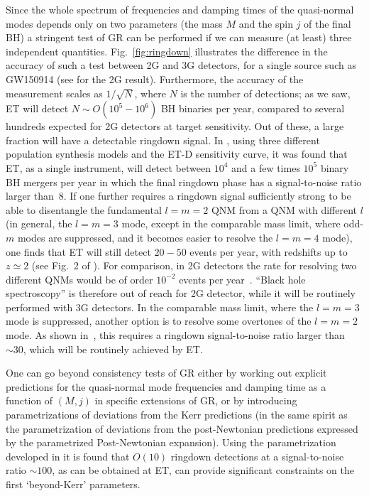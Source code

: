 Since the whole spectrum of frequencies and damping times of the quasi-normal modes depends only on two parameters (the mass $M$ and the spin $j$ of the final BH)  a stringent test of GR can be performed if we can  
measure (at least) three independent quantities. Fig.~\ref{fig:ringdown} illustrates the difference in the accuracy of such a test between 2G and 3G detectors, for a single source such as GW150914 (see \cite{Brito:2018rfr} for the 2G result). Furthermore, 
the accuracy of the measurement scales as $1/\sqrt{N}$, where $N$ is the number of detections;
as we saw, ET will detect $N\sim O(10^5-10^6)$ BH binaries per year,   compared to several hundreds expected for 2G detectors at target sensitivity. Out of these, a large fraction will  have a detectable ringdown signal. In \cite{Berti:2016lat}, 
using three different population synthesis models and the ET-D sensitivity curve, it was found  that ET,   as a single instrument, will detect between $10^4$ and a few times $10^5$ binary BH mergers per year in which the final ringdown phase has a signal-to-noise ratio  larger than~8. If one further requires a ringdown signal sufficiently strong to be able to disentangle the fundamental $l=m=2$ QNM from a QNM with different $l$ (in general, the $l=m=3$ mode, except in the comparable mass limit, where odd-$m$ modes are suppressed, and it becomes easier to resolve the $l=m=4$ mode), one finds that ET will still detect  $20-50$ events per year, with redshifts up to $z\simeq 2$ (see Fig.~2 of \cite{Berti:2016lat}). For comparison, in 2G detectors the  rate  for resolving two different QNMs would be of order $10^{-2}$ events per year~\cite{Berti:2016lat}. ``Black hole spectroscopy'' is therefore out of reach for 2G detector, while it will be routinely performed with 3G detectors.
In the comparable mass limit, where the $l=m=3$ mode is suppressed, another option is to resolve some overtones of the $l=m=2$ mode. As shown in~\cite{Bhagwat:2019dtm}, this requires a ringdown signal-to-noise ratio larger than $\sim 30$, which will be routinely achieved by ET. 

One can go beyond consistency tests of GR either by working out explicit predictions for the quasi-normal mode frequencies and damping time as a function of $(M,j)$ in specific extensions of GR, or by introducing parametrizations of deviations from the Kerr predictions (in the same spirit as the parametrization of deviations from the post-Newtonian predictions expressed by the parametrized Post-Newtonian expansion).  Using the parametrization  developed in \cite{Maselli:2019mjd} it is found that $O(10)$ ringdown detections at a signal-to-noise ratio $\sim 100$, as can be obtained at ET, can provide significant constraints on the first  `beyond-Kerr' parameters.

